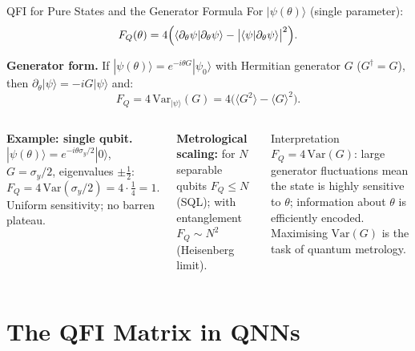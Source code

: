 \documentclass[aspectratio=169,10pt]{beamer}
\newcommand{\Variance}{\mathrm{Var}}
\begin{document}
\begin{frame}{QFI for Pure States and the Generator Formula}
  For $|\psi(\theta)\rangle$ (single parameter):
  \[
    F_Q(\theta)
    = 4\Bigl(
        \langle\partial_\theta\psi|\partial_\theta\psi\rangle
       -\bigl|\langle\psi|\partial_\theta\psi\rangle\bigr|^2
      \Bigr).
  \]

  \textbf{Generator form.}
  If $|\psi(\theta)\rangle = e^{-i\theta G}|\psi_0\rangle$
  with Hermitian generator $G$ ($G^\dagger=G$), then
  $\partial_\theta|\psi\rangle = -iG|\psi\rangle$ and:
  \[
    F_Q = 4\,\Variance_{|\psi\rangle}(G)
        = 4\bigl(\langle G^2\rangle - \langle G\rangle^2\bigr).
  \]

  \begin{columns}[T]
    \textbf{Example: single qubit.}
    $|\psi(\theta)\rangle = e^{-i\theta\sigma_y/2}|0\rangle$,
    $G=\sigma_y/2$, eigenvalues $\pm\tfrac12$:
    \[
      F_Q = 4\,\Variance(\sigma_y/2)
          = 4\cdot\tfrac14 = 1.
    \]
    Uniform sensitivity; no barren plateau.

    \textbf{Metrological scaling:}
    for $N$ separable qubits $F_Q\leq N$ (SQL);
    with entanglement $F_Q\sim N^2$ (Heisenberg limit).
    \begin{alertblock}{Interpretation}
      $F_Q = 4\,\Variance(G)$: large generator fluctuations
      mean the state is highly sensitive to $\theta$;
      information about $\theta$ is efficiently encoded.
      Maximising $\Variance(G)$ is the task of
      quantum metrology.
    \end{alertblock}
  \end{columns}
\end{frame}

\section{The QFI Matrix in QNNs}
\end{document}
